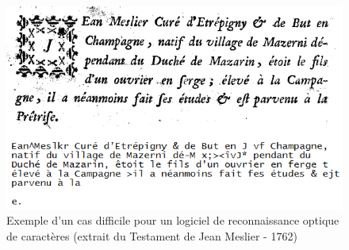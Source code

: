 \bigskip

\vfill
\hspace{0pt}

\begin{figure}[ht]
\centering
\centerline{  %
\includegraphics[scale=1]{3-Methode-CREA/images/1-pre-traitement-semantique/exemple_probleme_OCR.png}
}
\caption{Exemple d'un cas difficile pour un logiciel de reconnaissance optique de caractères (extrait du Testament de Jean Meslier - 1762)}
\label{figure:3-I-3-NettoyageDonnees-ProblemeOCR}
\end{figure}

\hspace{0pt}
\vfill

\bigskip


